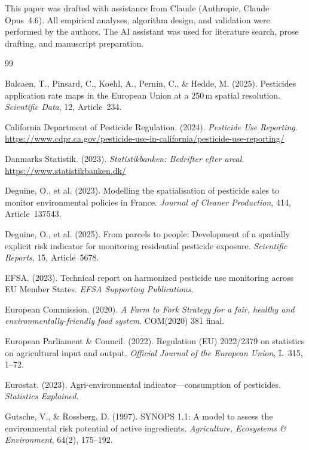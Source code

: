 \documentclass[12pt,a4paper]{article}
\begin{document}
This paper was drafted with assistance from Claude (Anthropic, Claude Opus~4.6). All empirical analyses, algorithm design, and validation were performed by the authors. The AI assistant was used for literature search, prose drafting, and manuscript preparation.

\begin{thebibliography}{99}

 Balcaen, T., Pinsard, C., Koehl, A., Pernin, C., \& Hedde, M. (2025). Pesticides application rate maps in the European Union at a 250\,m spatial resolution. \textit{Scientific Data}, 12, Article~234.

 California Department of Pesticide Regulation. (2024). \textit{Pesticide Use Reporting}. \url{https://www.cdpr.ca.gov/pesticide-use-in-california/pesticide-use-reporting/}

 Danmarks Statistik. (2023). \textit{Statistikbanken: Bedrifter efter areal}. \url{https://www.statistikbanken.dk/}

 Deguine, O., et al. (2023). Modelling the spatialisation of pesticide sales to monitor environmental policies in France. \textit{Journal of Cleaner Production}, 414, Article~137543.

 Deguine, O., et al. (2025). From parcels to people: Development of a spatially explicit risk indicator for monitoring residential pesticide exposure. \textit{Scientific Reports}, 15, Article~5678.

 EFSA. (2023). Technical report on harmonized pesticide use monitoring across EU Member States. \textit{EFSA Supporting Publications}.

 European Commission. (2020). \textit{A Farm to Fork Strategy for a fair, healthy and environmentally-friendly food system}. COM(2020) 381 final.

 European Parliament \& Council. (2022). Regulation (EU) 2022/2379 on statistics on agricultural input and output. \textit{Official Journal of the European Union}, L~315, 1--72.

 Eurostat. (2023). Agri-environmental indicator---consumption of pesticides. \textit{Statistics Explained}.

 Gutsche, V., \& Rossberg, D. (1997). SYNOPS 1.1: A model to assess the environmental risk potential of active ingredients. \textit{Agriculture, Ecosystems \& Environment}, 64(2), 175--192.


\end{thebibliography}
\end{document}
